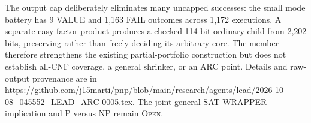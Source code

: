 The output cap deliberately eliminates many uncapped successes: the small
mode battery has 9 VALUE and 1,163 FAIL outcomes across 1,172 executions.
A separate easy-factor product produces a checked 114-bit ordinary child
from 2,202 bits, preserving rather than freely deciding its arbitrary core.
The member therefore strengthens the existing partial-portfolio construction
but does not establish all-CNF coverage, a general shrinker, or an ARC point.
Details and raw-output provenance are in
\url{https://github.com/j15marti/pnp/blob/main/research/agents/lead/2026-10-08_045552_LEAD_ARC-0005.tex}.
The joint general-SAT WRAPPER implication and P versus NP remain
\textsc{Open}.
